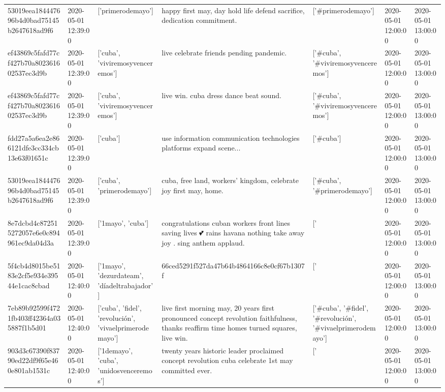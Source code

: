 \begin{tabular}{lllllll}
53019eea184447696b4d0bad75145b2647618ad9f6 & 2020-05-01 12:39:00 & ['primerodemayo'] & happy first may, day hold life defend sacrifice, dedication commitment. & ['#primerodemayo'] & 2020-05-01 12:00:00 & 2020-05-01 13:00:00 \\
ef43869c5fafd77cf427b70a802361602537ec3d9b & 2020-05-01 12:39:00 & ['cuba', 'viviremosyvenceremos'] & live celebrate friends pending pandemic. & ['#cuba', '#viviremosyvenceremos'] & 2020-05-01 12:00:00 & 2020-05-01 13:00:00 \\
ef43869c5fafd77cf427b70a802361602537ec3d9b & 2020-05-01 12:39:00 & ['cuba', 'viviremosyvenceremos'] & live win. cuba dress dance beat sound. & ['#cuba', '#viviremosyvenceremos'] & 2020-05-01 12:00:00 & 2020-05-01 13:00:00 \\
fdd27a5a6ea2e866121dfe3cc334cb13e63f01651c & 2020-05-01 12:39:00 & ['cuba'] & use information communication technologies platforms expand scene... & ['#cuba'] & 2020-05-01 12:00:00 & 2020-05-01 13:00:00 \\
53019eea184447696b4d0bad75145b2647618ad9f6 & 2020-05-01 12:39:00 & ['cuba', 'primerodemayo'] & cuba, free land, workers' kingdom, celebrate joy first may, home. & ['#cuba', '#primerodemayo'] & 2020-05-01 12:00:00 & 2020-05-01 13:00:00 \\
8e7dcbd4c872515272057e6e0c894961ec9da04d3a & 2020-05-01 12:39:00 & ['1mayo', 'cuba'] & congratulations cuban workers front lines saving lives 💕 rains havana nothing take away joy . sing anthem applaud. & ['#1mayo', '#cuba'] & 2020-05-01 12:00:00 & 2020-05-01 13:00:00 \\
5f4cb4d8015be5183e2cf5e934e39544e1cac8cbad & 2020-05-01 12:40:00 & ['1mayo', 'dezurdateam', 'díadeltrabajador'] & 66ced5291f527da47b64b4864166c8e0cf67b1307f & ['#1mayo', '#dezurdateam', '#díadeltrabajador'] & 2020-05-01 12:00:00 & 2020-05-01 13:00:00 \\
7eb89b92599f4721fb403ff42364a035887f1b5d01 & 2020-05-01 12:40:00 & ['cuba', 'fidel', 'revolución', 'vivaelprimerodemayo'] & live first morning may, 20 years first pronounced concept revolution faithfulness, thanks reaffirm time homes turned squares, live win. & ['#cuba', '#fidel', '#revolución', '#vivaelprimerodemayo'] & 2020-05-01 12:00:00 & 2020-05-01 13:00:00 \\
903d3c67390f83790ed22df9f65e460e801ab1531c & 2020-05-01 12:40:00 & ['1demayo', 'cuba', 'unidosvenceremos'] & twenty years historic leader proclaimed concept revolution cuba celebrate 1st may committed ever. & ['#1demayo', '#cuba', '#unidosvenceremos'] & 2020-05-01 12:00:00 & 2020-05-01 13:00:00 \\

\end{tabular}
